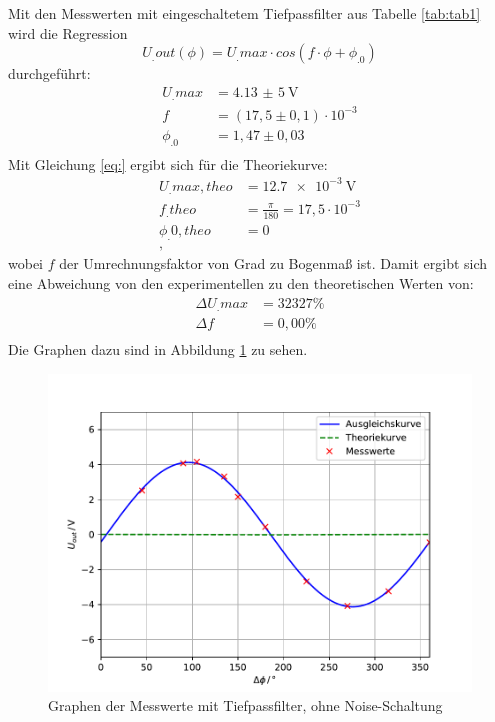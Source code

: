 \noindent Mit den Messwerten mit eingeschaltetem Tiefpassfilter aus Tabelle \ref{tab:tab1} wird die Regression
\begin{equation}
U_.{out}(\phi) = U_.{max}\cdot cos(f\cdot\phi+\phi_.0)\label{eq:Reg}
\end{equation}
durchgeführt:
\begin{align*}
U_.{max} &= \SI{4,13(5)}{\volt} \\
f 		 &= (17,5\pm0,1)\cdot 10^{-3} \\
\phi_.0  &= 1,47 \pm0,03 \\
\end{align*}
Mit Gleichung \eqref{eq:} ergibt sich für die Theoriekurve:
\begin{align*}
U_.{max,theo} &= \SI{12,7e-3}{\volt} \\
f_.{theo}	  &= \frac{\pi}{180} = 17,5 \cdot 10^{-3} \\
\phi_.{0,theo}&= 0 \\,
\end{align*}
wobei $f$ der Umrechnungsfaktor von Grad zu Bogenmaß ist.
Damit ergibt sich eine Abweichung von den experimentellen zu den theoretischen Werten von:
\begin{align*}
\Delta U_.{max} &= 32327\% \\
\Delta f		&= 0,00\% \\
\end{align*}
Die Graphen dazu sind in Abbildung \ref{fig:U2} zu sehen.
\begin{figure}
\centering
\includegraphics[width=\linewidth-75pt,height=\textheight-75pt,keepaspectratio]{content/images/plot.pdf}
\caption{Graphen der Messwerte mit Tiefpassfilter, ohne Noise-Schaltung}
\label{fig:U2}
\end{figure}
